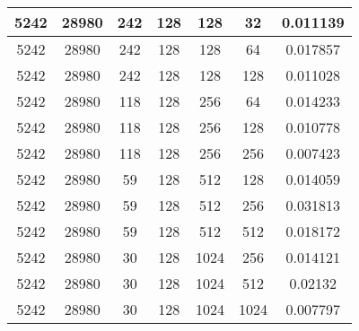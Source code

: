 \documentclass[9pt]{article}
\begin{document}
\begin{tabular}{|c|c|c|c|c|c|c| }
\hline
5242  & 28980  & 242  & 128  & 128  & 32  & 0.011139 \\
\hline
5242  & 28980  & 242  & 128  & 128  & 64  & 0.017857 \\
\hline
5242  & 28980  & 242  & 128  & 128  & 128  & 0.011028 \\
\hline
5242  & 28980  & 118  & 128  & 256  & 64  & 0.014233 \\
\hline
5242  & 28980  & 118  & 128  & 256  & 128  & 0.010778 \\
\hline
5242  & 28980  & 118  & 128  & 256  & 256  & 0.007423 \\
\hline
5242  & 28980  & 59  & 128  & 512  & 128  & 0.014059 \\
\hline
5242  & 28980  & 59  & 128  & 512  & 256  & 0.031813 \\
\hline
5242  & 28980  & 59  & 128  & 512  & 512  & 0.018172 \\
\hline
5242  & 28980  & 30  & 128  & 1024  & 256  & 0.014121 \\
\hline
5242  & 28980  & 30  & 128  & 1024  & 512  & 0.02132 \\
\hline
5242  & 28980  & 30  & 128  & 1024  & 1024  & 0.007797 \\
\hline
\end{tabular}
 
\end{document}
